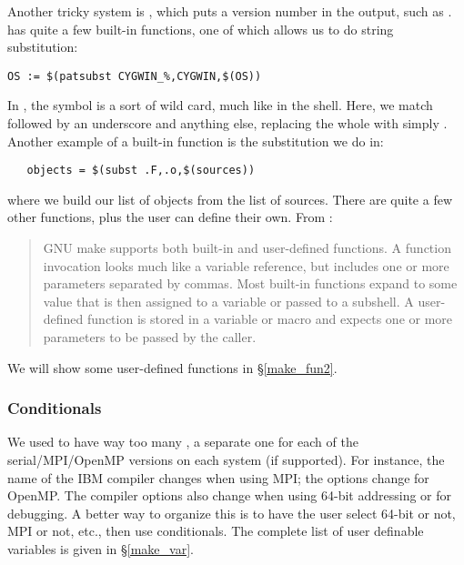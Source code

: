 Another tricky system is , which puts a version number
in the  output, such as .  has
quite a few built-in functions, one of which allows us to do string
substitution:
\begin{verbatim}
OS := $(patsubst CYGWIN_%,CYGWIN,$(OS))
\end{verbatim}
In , the \code{\%} symbol is a sort of wild card, much
like \code{*} in the shell.
Here, we match  followed by an underscore and anything else,
replacing the whole with simply . Another example of a
built-in function is the substitution we do in:
\begin{verbatim}
   objects = $(subst .F,.o,$(sources))
\end{verbatim}
where we build our list of objects from the list of sources.
There are quite a few other functions, plus the user can define
their own. From \citet{GMAKE}:
\begin{quote}
GNU make supports both built-in and user-defined functions.
A function invocation looks much like a variable reference, but
includes one or more parameters separated by commas.  Most built-in
functions expand to some value that is then assigned to a variable
or passed to a subshell. A user-defined function is stored in a
variable or macro and expects one or more parameters to be passed
by the caller.
\end{quote}
We will show some user-defined functions in \S\ref{make_fun2}.

\subsubsection{Conditionals}

We used to have way too many , a separate one for each
of the serial/MPI/OpenMP versions on each system (if supported). For
instance, the name of the IBM compiler changes when using MPI; the
options change for OpenMP. The compiler options also change when using
64-bit addressing or for debugging.
A better way to organize this is to have the user select 64-bit or not, MPI
or not, etc., then use conditionals. The complete list of
user definable  variables is given in \S\ref{make_var}.

